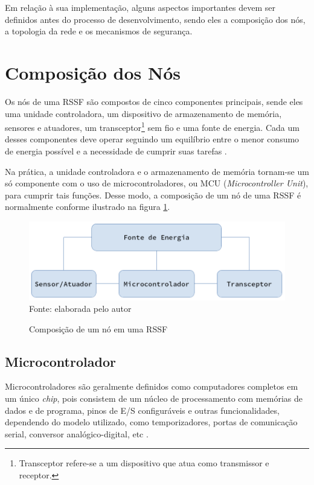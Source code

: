 Em relação à sua implementação, alguns aspectos importantes devem ser definidos antes do processo de
desenvolvimento, sendo eles a composição dos nós, a topologia da rede e os mecanismos de segurança.

\section{Composição dos Nós}
Os nós de uma RSSF são compostos de cinco componentes principais, sende eles uma unidade controladora, um
dispositivo de armazenamento de memória, sensores e atuadores, um transceptor\footnote{Transceptor refere-se a
um dispositivo que atua como transmissor e receptor.} sem fio e uma fonte de energia. Cada um desses
componentes deve operar seguindo um equilíbrio entre o menor consumo de energia possível e a necessidade de
cumprir suas tarefas \cite{karl_willig2005}.

Na prática, a unidade controladora e o armazenamento de memória tornam-se um só componente com o uso de
microcontroladores, ou MCU (\textit{Microcontroller Unit}), para cumprir tais funções. Desse modo, a
composição de um nó de uma RSSF é normalmente conforme ilustrado na figura \ref{figura:node}.

\begin{figure}[h]
	\caption{Composição de um nó em uma RSSF}
	\centering
	\includegraphics[scale=0.5]{../images/node.png}
	\hspace{\linewidth}
	Fonte: elaborada pelo autor
	\label{figura:node}
\end{figure}

\subsection{Microcontrolador}
Microcontroladores são geralmente definidos como computadores completos em um único \textit{chip}, pois
consistem de um núcleo de processamento com memórias de dados e de programa, pinos de E/S configuráveis e
outras funcionalidades, dependendo do modelo utilizado, como temporizadores, portas de comunicação serial,
conversor analógico-digital, etc \cite{williams2014,kuorilehto2007}.

